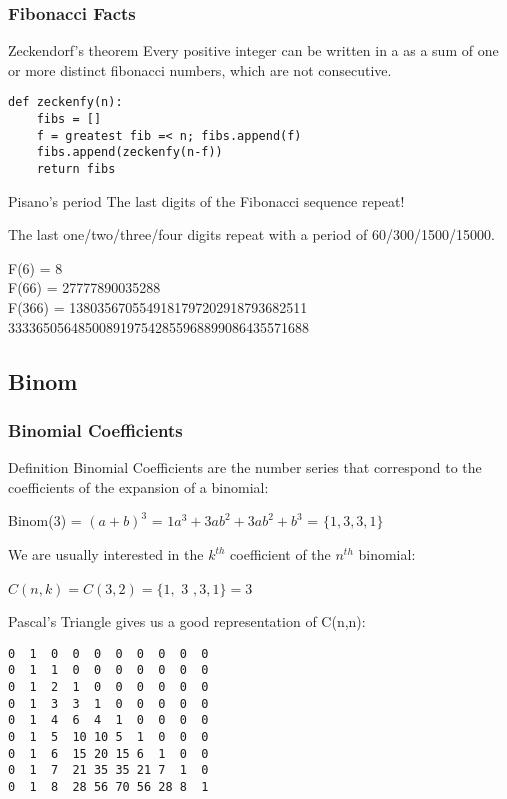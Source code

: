 \documentclass{beamer}
\begin{document}
\begin{frame}[fragile]
  \frametitle{Fibonacci Facts}
  {\smaller
  \begin{block}{Zeckendorf's theorem}
    Every positive integer can be written in a  as a sum of
    one or more distinct fibonacci numbers, which are not consecutive.

\begin{verbatim}
def zeckenfy(n):
    fibs = []
    f = greatest fib =< n; fibs.append(f)
    fibs.append(zeckenfy(n-f))
    return fibs
\end{verbatim}
  \end{block}

  \begin{block}{Pisano's period}
    The last digits of the Fibonacci sequence repeat!

    \medskip

    The last one/two/\alert{three/four} digits repeat with a period of
    60/300/\alert{1500/15000}.

    F(6) = 8\\
    F(66) = 27777890035288\\
    F(366) = 1380356705549181797202918793682511 3333650564850089197542855968899086435571688

  \end{block}
  }
\end{frame}

\subsection{Binom}

\begin{frame}[fragile]
  \frametitle{Binomial Coefficients}
  {\smaller

    \begin{block}{Definition}
      Binomial Coefficients are the number series that correspond to
      the coefficients of the expansion of a binomial:

      \medskip

      Binom(3) = $(a+b)^3$ = $1a^3 + 3ab^2 + 3ab^2 + b^3$ = $\{1,3,3,1\}$

      \medskip

      We are usually interested in the $k^{th}$ coefficient of the
      $n^{th}$ binomial:

      \medskip

      $C(n,k) = C(3,2) = \{1,$ \alert{3} $,3,1\} = 3$

    \end{block}

    Pascal's Triangle gives us a good representation of C(n,n):
\begin{verbatim}
0  1  0  0  0  0  0  0  0  0
0  1  1  0  0  0  0  0  0  0
0  1  2  1  0  0  0  0  0  0
0  1  3  3  1  0  0  0  0  0
0  1  4  6  4  1  0  0  0  0
0  1  5  10 10 5  1  0  0  0
0  1  6  15 20 15 6  1  0  0
0  1  7  21 35 35 21 7  1  0
0  1  8  28 56 70 56 28 8  1
\end{verbatim}
  }
\end{frame}
\end{document}
